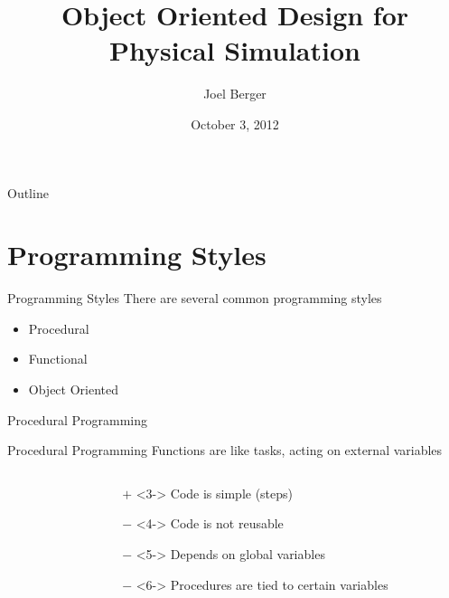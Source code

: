 \documentclass[mathserif]{beamer}
\title[OO Design]{Object Oriented Design for Physical Simulation}
\author{Joel Berger}
\institute[UIC]{University of Illinois at Chicago}
\date{October 3, 2012}
\providecommand{\inputcode}[1]{
  \begin{block}{}
    \scriptsize{}
  \end{block}
}
\begin{document}
\begin{frame}
  \maketitle
\end{frame}

\begin{frame}{Outline}
  \tableofcontents
\end{frame}


\section{Programming Styles}

\begin{frame}{Programming Styles}
  There are several common programming styles
  \begin{itemize}
    \item Procedural
    \item Functional
    \item Object Oriented
  \end{itemize}
\end{frame}

\begin{frame}{Procedural Programming}
  \begin{block}{Procedural Programming}
    Functions are like tasks, acting on external variables
  \end{block}
  \begin{columns}
    \begin{column}{0.49\linewidth}
      \uncover<2->{\inputcode{styles/procedural}}
    \end{column}
    \begin{column}{0.49\linewidth}
      \begin{itemize}
        \item[$+$]<3-> Code is simple (steps)
        \item[$-$]<4-> Code is not reusable
        \item[$-$]<5-> Depends on global variables
        \item[$-$]<6-> Procedures are tied to certain variables
      \end{itemize}
    \end{column}
  \end{columns}
\end{frame}
\end{document}

